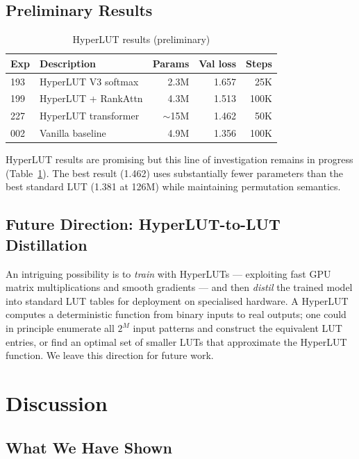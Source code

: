 \documentclass[11pt]{article}
\begin{document}
\subsection{Preliminary Results}

\begin{table}[!t]
\caption{HyperLUT results (preliminary)}
\label{tab:hyperlut}
\centering
\begin{tabular}{llrrr}
\toprule
Exp & Description & Params & Val loss & Steps \\
\midrule
193 & HyperLUT V3 softmax & 2.3M & 1.657 & 25K \\
199 & HyperLUT + RankAttn & 4.3M & 1.513 & 100K \\
227 & HyperLUT transformer & $\sim$15M & 1.462 & 50K \\
\midrule
002 & Vanilla baseline & 4.9M & 1.356 & 100K \\
\bottomrule
\end{tabular}
\end{table}

HyperLUT results are promising but this line of investigation remains in progress (Table~\ref{tab:hyperlut}).
The best result (1.462) uses substantially fewer parameters than the best standard LUT (1.381 at 126M) while maintaining permutation semantics.

\subsection{Future Direction: HyperLUT-to-LUT Distillation}

An intriguing possibility is to \emph{train} with HyperLUTs --- exploiting fast GPU matrix multiplications and smooth gradients --- and then \emph{distil} the trained model into standard LUT tables for deployment on specialised hardware.
A HyperLUT computes a deterministic function from binary inputs to real outputs; one could in principle enumerate all $2^M$ input patterns and construct the equivalent LUT entries, or find an optimal set of smaller LUTs that approximate the HyperLUT function.
We leave this direction for future work.


\section{Discussion}
\label{sec:discussion}

\subsection{What We Have Shown}
\end{document}
